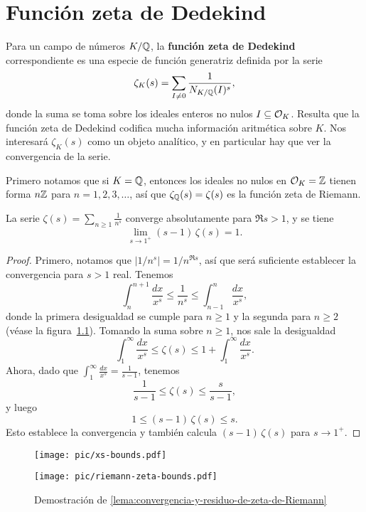 \chapter{Función zeta de Dedekind}


Para un campo de números $K/\mathbb{Q}$, la \textbf{función zeta de Dedekind}
correspondiente es una especie de función generatriz definida por la serie
$$\zeta_K (s) = \sum_{I \ne 0} \frac{1}{N_{K/\mathbb{Q}} (I)^s},$$
donde la suma se toma sobre los ideales enteros no nulos $I \subseteq \mathcal{O}_K$.
Resulta que la función zeta de Dedekind codifica mucha información aritmética
sobre $K$. Nos interesará $\zeta_K (s)$ como un objeto analítico, y en
particular hay que ver la convergencia de la serie.

Primero notamos que si $K = \mathbb{Q}$, entonces los ideales no nulos en $\mathcal{O}_K = \mathbb{Z}$
tienen forma $n\mathbb{Z}$ para $n = 1,2,3,\ldots$, así que $\zeta_{\mathbb{Q}} (s) = \zeta (s)$
es la función zeta de Riemann.

\begin{lema}
  \label{lema:convergencia-y-residuo-de-zeta-de-Riemann}
  La serie $\zeta (s) = \sum_{n\ge 1} \frac{1}{n^s}$ converge absolutamente para
  $\Re s > 1$, y se tiene
  $$\lim_{s \to 1^+} (s - 1)\,\zeta (s) = 1.$$

  \begin{proof}
    Primero, notamos que $|1/n^s| = 1/n^{\Re s}$, así que será suficiente
    establecer la convergencia para $s > 1$ real. Tenemos
    $$\int_n^{n+1} \frac{dx}{x^s} \le \frac{1}{n^s} \le \int_{n-1}^n \frac{dx}{x^s},$$
    donde la primera desigualdad se cumple para $n \ge 1$ y la segunda para
    $n \ge 2$
    (véase la figura~\ref{fig:convergencia-y-residuo-de-zeta-de-Riemann}).
    Tomando la suma sobre $n \ge 1$, nos sale la desigualdad
    $$\int_1^\infty \frac{dx}{x^s} \le \zeta (s) \le 1 + \int_1^\infty \frac{dx}{x^s}.$$
    Ahora, dado que $\int_1^\infty \frac{dx}{x^s} = \frac{1}{s - 1}$, tenemos
    $$\frac{1}{s - 1} \le \zeta (s) \le \frac{s}{s - 1},$$
    y luego
    $$1 \le (s-1)\,\zeta (s) \le s.$$
    Esto establece la convergencia y también calcula $(s-1)\,\zeta (s)$ para
    $s \to 1^+$.
  \end{proof}
\end{lema}

\begin{figure}
  \begin{center}
    \texttt{[image: pic/xs-bounds.pdf]}
  \end{center}

  \begin{center}
    \texttt{[image: pic/riemann-zeta-bounds.pdf]}
  \end{center}

  \caption{Demostración de \ref{lema:convergencia-y-residuo-de-zeta-de-Riemann}}
  \label{fig:convergencia-y-residuo-de-zeta-de-Riemann}
\end{figure}

